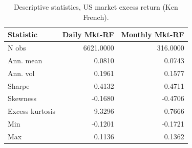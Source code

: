 \begin{table}[htbp]
\centering
\caption{Descriptive statistics, US market excess return (Ken French).}
\label{tab:descriptive}
\small
\begin{tabular}{lrr}
\toprule
Statistic & Daily Mkt-RF & Monthly Mkt-RF \\
\midrule
N obs & 6621.0000 & 316.0000 \\
Ann. mean & 0.0810 & 0.0743 \\
Ann. vol & 0.1961 & 0.1577 \\
Sharpe & 0.4132 & 0.4711 \\
Skewness & -0.1680 & -0.4706 \\
Excess kurtosis & 9.3296 & 0.7666 \\
Min & -0.1201 & -0.1721 \\
Max & 0.1136 & 0.1362 \\
\bottomrule
\end{tabular}
\end{table}
